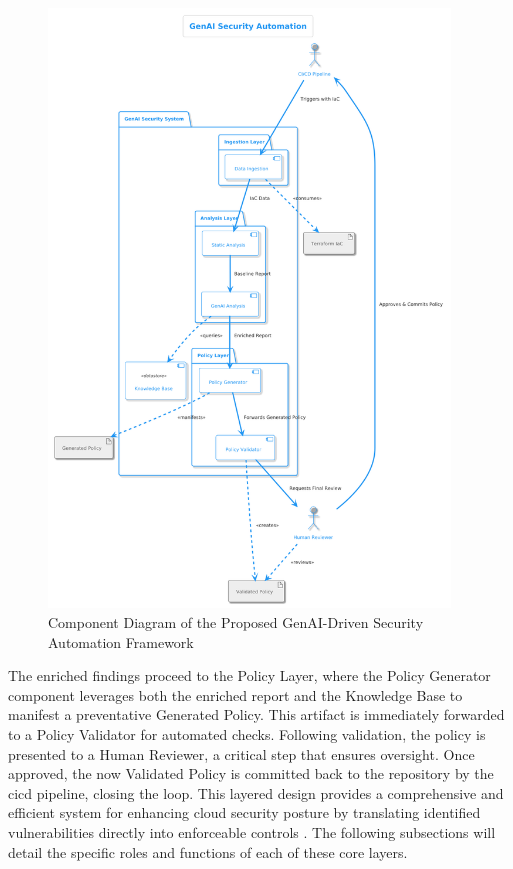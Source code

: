 \begin{figure}[htbp]
    \centering
    \includegraphics[width=0.95\textwidth]{Figures/component-abstract.png}
    \caption{Component Diagram of the Proposed GenAI-Driven Security Automation Framework}
    \label{fig:prototype-architecture}
\end{figure}

The enriched findings proceed to the Policy Layer, where the Policy Generator component leverages both the enriched report and the Knowledge Base to manifest a preventative Generated Policy. This artifact is immediately forwarded to a Policy Validator for automated checks. Following validation, the policy is presented to a Human Reviewer, a critical step that ensures oversight. Once approved, the now Validated Policy is committed back to the repository by the \gls{cicd} pipeline, closing the loop. This layered design provides a comprehensive and efficient system for enhancing cloud security posture by translating identified vulnerabilities directly into enforceable controls \cite{fakih_llm4cve_2025}. The following subsections will detail the specific roles and functions of each of these core layers.

